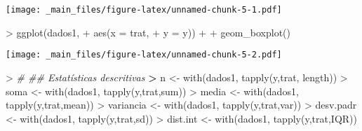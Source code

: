 \documentclass[
]{book}
\newenvironment{Shaded}{\begin{snugshade}}{\end{snugshade}}
\newcommand{\AttributeTok}[1]{\textcolor[rgb]{0.77,0.63,0.00}{#1}}
\newcommand{\CommentTok}[1]{\textcolor[rgb]{0.56,0.35,0.01}{\textit{#1}}}
\newcommand{\ErrorTok}[1]{\textcolor[rgb]{0.64,0.00,0.00}{\textbf{#1}}}
\newcommand{\FunctionTok}[1]{\textcolor[rgb]{0.00,0.00,0.00}{#1}}
\newcommand{\NormalTok}[1]{#1}
\newcommand{\OtherTok}[1]{\textcolor[rgb]{0.56,0.35,0.01}{#1}}
\newcommand{\SpecialCharTok}[1]{\textcolor[rgb]{0.00,0.00,0.00}{#1}}
\begin{document}
\texttt{[image: \_main\_files/figure-latex/unnamed-chunk-5-1.pdf]}

\begin{Shaded}
\begin{Highlighting}[]
\SpecialCharTok{\textgreater{}} \FunctionTok{ggplot}\NormalTok{(dados1,}
\SpecialCharTok{+}        \FunctionTok{aes}\NormalTok{(}\AttributeTok{x =}\NormalTok{ trat,}
\SpecialCharTok{+}            \AttributeTok{y =}\NormalTok{ y)) }\SpecialCharTok{+}
\SpecialCharTok{+}   \FunctionTok{geom\_boxplot}\NormalTok{()}
\end{Highlighting}
\end{Shaded}

\texttt{[image: \_main\_files/figure-latex/unnamed-chunk-5-2.pdf]}

\begin{Shaded}
\begin{Highlighting}[]
\SpecialCharTok{\textgreater{}} \CommentTok{\#\textquotesingle{} \#\# Estatísticas descritivas}
\ErrorTok{\textgreater{}}\NormalTok{ n }\OtherTok{\textless{}{-}} \FunctionTok{with}\NormalTok{(dados1, }\FunctionTok{tapply}\NormalTok{(y,trat, length))}
\SpecialCharTok{\textgreater{}}\NormalTok{ soma }\OtherTok{\textless{}{-}} \FunctionTok{with}\NormalTok{(dados1, }\FunctionTok{tapply}\NormalTok{(y,trat,sum))}
\SpecialCharTok{\textgreater{}}\NormalTok{ media }\OtherTok{\textless{}{-}} \FunctionTok{with}\NormalTok{(dados1, }\FunctionTok{tapply}\NormalTok{(y,trat,mean))}
\SpecialCharTok{\textgreater{}}\NormalTok{ variancia }\OtherTok{\textless{}{-}} \FunctionTok{with}\NormalTok{(dados1, }\FunctionTok{tapply}\NormalTok{(y,trat,var))}
\SpecialCharTok{\textgreater{}}\NormalTok{ desv.padr }\OtherTok{\textless{}{-}} \FunctionTok{with}\NormalTok{(dados1, }\FunctionTok{tapply}\NormalTok{(y,trat,sd))}
\SpecialCharTok{\textgreater{}}\NormalTok{ dist.int }\OtherTok{\textless{}{-}} \FunctionTok{with}\NormalTok{(dados1, }\FunctionTok{tapply}\NormalTok{(y,trat,IQR))}
\end{Highlighting}
\end{Shaded}
\end{document}
